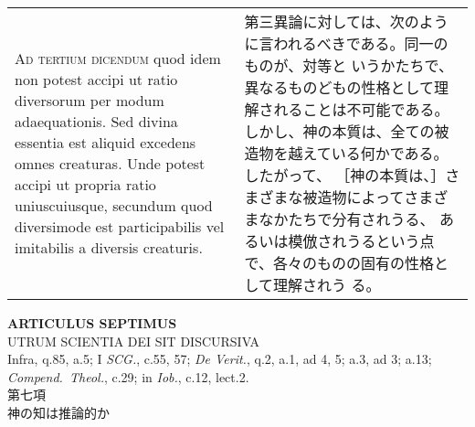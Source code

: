 \documentclass[10pt]{jsarticle} %
\begin{document}
\begin{longtable}{p{21em}p{21em}}
\\


{\scshape Ad tertium dicendum} quod idem non potest accipi ut ratio
diversorum per modum adaequationis. Sed divina essentia est aliquid
excedens omnes creaturas. Unde potest accipi ut propria ratio
uniuscuiusque, secundum quod diversimode est participabilis vel
imitabilis a diversis creaturis.

&

第三異論に対しては、次のように言われるべきである。同一のものが、対等と
いうかたちで、異なるものどもの性格として理解されることは不可能である。
しかし、神の本質は、全ての被造物を越えている何かである。したがって、
［神の本質は、］さまざまな被造物によってさまざまなかたちで分有されうる、
あるいは模倣されうるという点で、各々のものの固有の性格として理解されう
る。

\\

\end{longtable}
\newpage



\begin{center}
{\Large {\bf ARTICULUS SEPTIMUS}}\\ {\large UTRUM SCIENTIA DEI SIT
DISCURSIVA}\\ {\footnotesize Infra, q.85, a.5; I {\itshape SCG.},
c.55, 57; {\itshape De Verit.}, q.2, a.1, ad 4, 5; a.3, ad 3;
a.13; {\itshape Compend.~Theol.}, c.29; in {\itshape Iob.}, c.12,
lect.2.}\\ {\Large 第七項\\神の知は推論的か}
\end{center}
\end{document}
